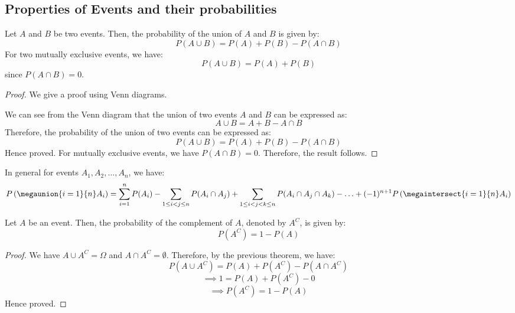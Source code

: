 \documentclass[openany]{book}
\begin{document}
\subsection{Properties of Events and their probabilities}
\begin{mytheorem}
    Let $A$ and $B$ be two events. Then, the probability of the union of $A$ and $B$ is given by:
    $$P(A \cup B) = P(A) + P(B) - P(A \cap B)$$
    For two mutually exclusive events, we have:
    $$P(A \cup B) = P(A) + P(B)$$ since $P(A \cap B) = 0$.
\end{mytheorem}
\begin{proof}
    We give a proof using Venn diagrams. \\
    \begin{figure}[H]
        \centering
\end{figure}
We can see from the Venn diagram that the union of two events $A$ and $B$ can be expressed as:
$$A \cup B = A + B - A \cap B$$
Therefore, the probability of the union of two events can be expressed as:
$$P(A \cup B) = P(A) + P(B) - P(A \cap B)$$
Hence proved. For mutually exclusive events, we have $P(A \cap B) = 0$. Therefore, the result follows.
\end{proof}
\begin{corollary}
    In general for events $A_1, A_2, \ldots, A_n$, we have:
    $$P\left( \megaunion{i=1}{n}A_i \right) = \sum_{i=1}^{n} P(A_i) - \sum_{1\leq i < j\leq n} P(A_i \cap A_j) + \sum_{1\leq i < j < k \leq n} P(A_i \cap A_j \cap A_k) - \ldots + (-1)^{n+1}P \left( \megaintersect{i=1}{n}A_i \right)$$
\end{corollary}
\begin{mytheorem}
    Let $A$ be an event. Then, the probability of the complement of $A$, denoted by $A^C$, is given by:
    $$P(A^C) = 1 - P(A)$$
\end{mytheorem}
\begin{proof}
    We have $A \cup A^C = \Omega$ and $A \cap A^C = \emptyset$. Therefore, by the previous theorem, we have:
    $$P(A \cup A^C) = P(A) + P(A^C) - P(A \cap A^C)$$
    $$\implies 1 = P(A) + P(A^C) - 0$$
    $$\implies P(A^C) = 1 - P(A)$$
    Hence proved.
\end{proof}
\end{document}
